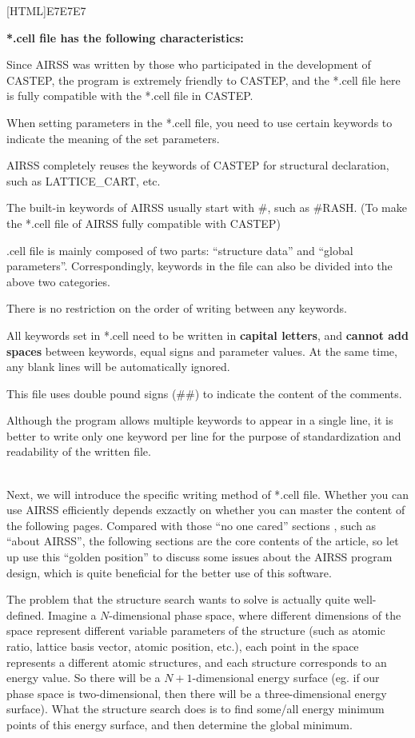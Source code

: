 \documentclass[a4paper, 10pt]{article}
\begin{document}
\noindent{}[HTML]{E7E7E7}{\parbox{\textwidth}{%
\noindent \textbf{*.cell file has the following characteristics:}
\begin{maineu}
\item Since AIRSS was written by those who participated in the development of CASTEP, the program is extremely friendly to CASTEP, and the *.cell file here is fully compatible with the *.cell file in CASTEP.
\item When setting parameters in the *.cell file, you need to use certain keywords to indicate the meaning of the set parameters.
\item AIRSS completely reuses the keywords of CASTEP for structural declaration, such as LATTICE\_CART, etc.
\item The built-in keywords of AIRSS usually start with \#, such as \#RASH. (To make the *.cell file of AIRSS fully compatible with CASTEP)
\item *.cell file is mainly composed of two parts: ``structure data'' and ``global parameters''. Correspondingly, keywords in the file can also be divided into the above two categories.
\item There is no restriction on the order of writing between any keywords.
\item All keywords set in *.cell need to be written in \textbf{capital letters}, and \textbf{cannot add spaces} between keywords, equal signs and parameter values. At the same time, any blank lines will be automatically ignored.
\item This file uses double pound signs (\#\#) to indicate the content of the comments.
\item Although the program allows multiple keywords to appear in a single line, it is better to write only one keyword per line for the purpose of standardization and readability of the written file.
\end{maineu}}}\\

Next, we will introduce the specific writing method of *.cell file. Whether you can use AIRSS efficiently depends exzactly on whether you can master the content of the following pages. Compared with those ``no one cared'' sections , such as ``about AIRSS'', the following sections are the core contents of the article, so let up use this ``golden position'' to discuss some issues about the AIRSS program design, which is quite beneficial for the better use of this software.

The problem that the structure search wants to solve is actually quite well-defined. Imagine a \(N\)-dimensional phase space, where different dimensions of the space represent different variable parameters of the structure (such as atomic ratio, lattice basis vector, atomic position, etc.), each point in the space represents a different atomic structures, and each structure corresponds to an energy value. So there will be a \(N+1\)-dimensional energy surface (eg. if our phase space is two-dimensional, then there will be a three-dimensional energy surface). What the structure search does is to find some/all energy minimum points of this energy surface, and then determine the global minimum.
\end{document}
